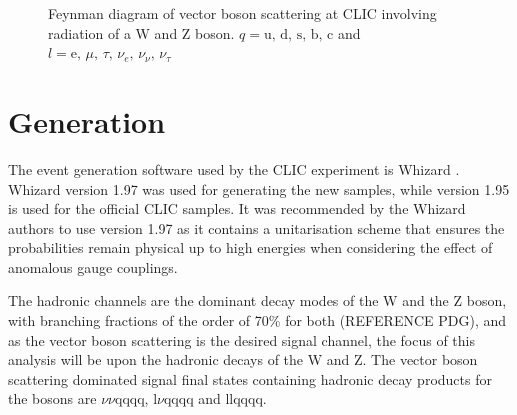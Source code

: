 \begin{figure}
\caption[Feynman diagram of vector boson scattering at CLIC involving radiation of Z bosons.]{Feynman diagram of vector boson scattering at CLIC involving radiation of a W and Z boson.  $q = \text{u, d, s, b, c}$ and $l = \text{e, } \mu \text{, } \tau \text{, } \nu_{e} \text{, } \nu_{\nu} \text{, } \nu_{\tau}$}
\label{fig:vbszw}
\end{figure}

\fi

\section{Generation}
\label{sec:eventgenerationandbackgrounds}
The event generation software used by the CLIC experiment is Whizard \cite{0708.4233, hep-ph/0102195}.  Whizard version 1.97 was used for generating the new samples, while version 1.95 is used for the official CLIC samples. It was recommended by the Whizard authors to use version 1.97 as it contains a unitarisation scheme that ensures the probabilities remain physical up to high energies when considering the effect of anomalous gauge couplings.  

The hadronic channels are the dominant decay modes of the W and the Z boson, with branching fractions of the order of 70\% for both (REFERENCE PDG), and as the vector boson scattering is the desired signal channel, the focus of this analysis will be upon the hadronic decays of the W and Z.  The vector boson scattering dominated signal final states containing hadronic decay products for the bosons are $\nu\nu\text{qqqq}$, $\text{l}\nu\text{qqqq}$ and llqqqq.  

